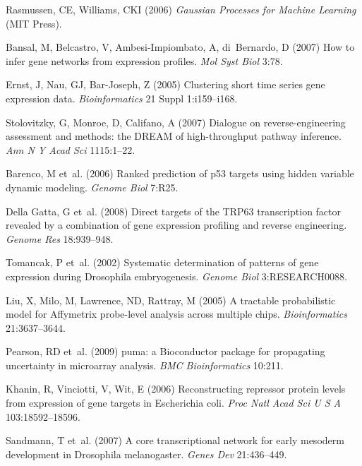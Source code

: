 \documentclass{pnastwo}
\begin{document}
\begin{article}
\begin{thebibliography}{10}
Rasmussen, CE, Williams, CKI
\newblock (2006) \emph{Gaussian Processes for Machine Learning}
\newblock (MIT Press).

Bansal, M, Belcastro, V, Ambesi-Impiombato, A, di~Bernardo, D
\newblock (2007) How to infer gene networks from expression profiles.
\newblock \emph{Mol Syst Biol} 3:78.

Ernst, J, Nau, GJ, Bar-Joseph, Z
\newblock (2005) Clustering short time series gene expression data.
\newblock \emph{Bioinformatics} 21 Suppl 1:i159--i168.

Stolovitzky, G, Monroe, D, Califano, A
\newblock (2007) Dialogue on reverse-engineering assessment and methods: the
  {DREAM} of high-throughput pathway inference.
\newblock \emph{Ann N Y Acad Sci} 1115:1--22.

Barenco, M et~al.
\newblock (2006) Ranked prediction of p53 targets using hidden variable dynamic
  modeling.
\newblock \emph{Genome Biol} 7:R25.

{Della Gatta}, G et~al.
\newblock (2008) Direct targets of the {TRP63} transcription factor revealed by
  a combination of gene expression profiling and reverse engineering.
\newblock \emph{Genome Res} 18:939--948.

Tomancak, P et~al.
\newblock (2002) Systematic determination of patterns of gene expression during
  {D}rosophila embryogenesis.
\newblock \emph{Genome Biol} 3:RESEARCH0088.

Liu, X, Milo, M, Lawrence, ND, Rattray, M
\newblock (2005) A tractable probabilistic model for {A}ffymetrix probe-level
  analysis across multiple chips.
\newblock \emph{Bioinformatics} 21:3637--3644.

Pearson, RD et~al.
\newblock (2009) puma: a {B}ioconductor package for propagating uncertainty in
  microarray analysis.
\newblock \emph{BMC Bioinformatics} 10:211.

Khanin, R, Vinciotti, V, Wit, E
\newblock (2006) Reconstructing repressor protein levels from expression of
  gene targets in {E}scherichia coli.
\newblock \emph{Proc Natl Acad Sci U S A} 103:18592--18596.

Sandmann, T et~al.
\newblock (2007) A core transcriptional network for early mesoderm development
  in {D}rosophila melanogaster.
\newblock \emph{Genes Dev} 21:436--449.


\end{thebibliography}
\end{article}
\end{document}
